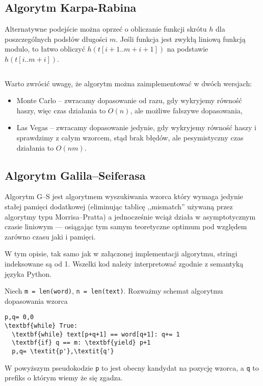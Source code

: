 \subsection{Algorytm Karpa-Rabina}

Alternatywne podejście można oprzeć o obliczanie funkcji skrótu $h$ dla poszczególnych podsłów długości $m$. Jeśli funkcja jest zwykłą liniową funkcją modulo, to łatwo obliczyć $h(t[i + 1..m + i + 1])$ na podstawie $h(t[i..m + i])$.

\begin{code}
\inputminted{python}{code/exact-string-matching/karp-rabin.py}
\label{alg:exact-string-matching-karp-rabin}
\end{code}

Warto zwrócić uwagę, że algorytm można zaimplementować w dwóch wersjach:
\begin{itemize}
    \item Monte Carlo -- zwracamy dopasowanie od razu, gdy wykryjemy równość haszy, więc czas działania to $O(n)$, ale możliwe fałszywe dopasowania,
    \item Las Vegas -- zwracamy dopasowanie jedynie, gdy wykryjemy równość haszy i sprawdzimy z całym wzorcem, stąd brak błędów, ale pesymistyczny czas działania to $O(n m)$.
\end{itemize}

\subsection{Algorytm Galila–Seiferasa}

Algorytm G--S jest algorytmem wyszukiwania wzorca który wymaga jedynie stałej pamięci dodatkowej (eliminując tablicę ,,mismatch'' używaną przez algorytmy typu Morrisa–Pratta) a jednocześnie wciąż działa w asymptotycznym czasie liniowym — osiągając tym samym teoretyczne optimum pod względem zarówno czasu jaki i pamięci.

W tym opisie, tak samo jak w załączonej implementacji algorytmu, stringi indeksowane są od 1. Wszelki kod należy interpretować zgodnie z semantyką języka Python.

Niech \texttt{m = len(word)}, \texttt{n = len(text)}. Rozważmy schemat algorytmu dopasowania wzorca
\begin{verbatim}
p,q= 0,0
\textbf{while} True:
  \textbf{while} text[p+q+1] == word[q+1]: q+= 1
  \textbf{if} q == m: \textbf{yield} p+1
  p,q= \textit{p'},\textit{q'}
\end{verbatim}
W powyższym pseudokodzie \texttt{p} to jest obecny kandydat na pozycję wzorca, a \texttt{q} to prefiks o którym wiemy że się zgadza.


